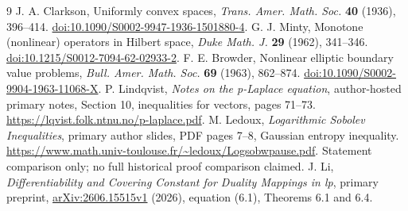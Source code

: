 \documentclass[11pt]{article}
\theoremstyle{remark}\newtheorem{remark}[theorem]{Remark}
\begin{document}
\begin{thebibliography}{9}
 J. A. Clarkson,
Uniformly convex spaces, \emph{Trans. Amer. Math. Soc.} \textbf{40}
(1936), 396--414. \href{https://doi.org/10.1090/S0002-9947-1936-1501880-4}{doi:10.1090/S0002-9947-1936-1501880-4}.
 G. J. Minty,
Monotone (nonlinear) operators in Hilbert space,
\emph{Duke Math. J.} \textbf{29} (1962), 341--346.
\href{https://doi.org/10.1215/S0012-7094-62-02933-2}{doi:10.1215/S0012-7094-62-02933-2}.
 F. E. Browder,
Nonlinear elliptic boundary value problems,
\emph{Bull. Amer. Math. Soc.} \textbf{69} (1963), 862--874.
\href{https://doi.org/10.1090/S0002-9904-1963-11068-X}{doi:10.1090/S0002-9904-1963-11068-X}.
 P. Lindqvist,
\emph{Notes on the p-Laplace equation}, author-hosted primary notes,
Section 10, inequalities for vectors, pages 71--73.
\url{https://lqvist.folk.ntnu.no/p-laplace.pdf}.
 M. Ledoux,
\emph{Logarithmic Sobolev Inequalities}, primary author slides,
PDF pages 7--8, Gaussian entropy inequality.
\url{https://www.math.univ-toulouse.fr/~ledoux/Logsobwpause.pdf}.
Statement comparison only; no full historical proof comparison claimed.
 J. Li,
\emph{Differentiability and Covering Constant for Duality Mappings in lp},
primary preprint, \href{https://arxiv.org/abs/2606.15515v1}{arXiv:2606.15515v1}
(2026), equation (6.1), Theorems 6.1 and 6.4.
\end{thebibliography}
\end{document}
